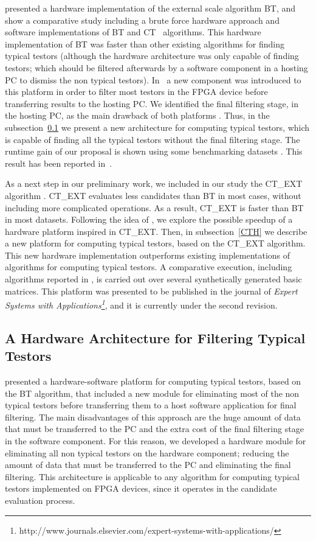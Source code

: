 \documentclass[authoryear,11pt]{elsarticle}
\begin{document}
	\cite{Rojas07} presented a hardware implementation of the external scale algorithm BT, and show a 
	comparative study including a brute force hardware approach and software implementations of BT and 
	CT~\citep{Bravo83} algorithms. 
	This hardware implementation of BT was faster than other existing algorithms for finding 
	typical	testors (although the hardware architecture was only capable of finding testors; which should 
	be filtered afterwards by a software component in a hosting PC to dismiss the non typical testors). 
	In~\citep{Rojas12} a new component was introduced to this platform in order to filter most testors in 
	the FPGA device before transferring results to the hosting PC. We identified the final filtering stage,
	in the hosting PC, as the main drawback of both platforms \citep{Rojas07,Rojas12}.
	Thus, in the subsection~\ref{OnlyTT} we present a new architecture 
	for computing typical testors, which is capable of finding all the typical testors without the
	final filtering stage. 
	The runtime gain of our proposal is shown using some benchmarking datasets \citep{Bache13}.
	This result has been reported in~\citep{Rodriguez14}. 
	
	As a next step in our preliminary work, we included in our study the CT\_EXT algorithm \citep{Sanchez07}.
	CT\_EXT evaluates less candidates than BT in most cases, without including more complicated operations.
	As a result, CT\_EXT is faster than BT in most datasets. Following the idea of \cite{Rojas07}, we explore
	the possible speedup of a hardware platform inspired in CT\_EXT.
	Then, in subsection~\ref{CTH} we	describe a new platform for computing typical testors, based on the 
	CT\_EXT algorithm. This new hardware implementation outperforms existing implementations of algorithms 
	for computing typical testors. A comparative execution, including algorithms reported in 
	\citep{Rodriguez14,Sanchez07}, is carried out over several synthetically generated basic matrices.
	This platform was presented to be published in the journal of \emph{Expert Systems with 
	Applications\footnote{http://www.journals.elsevier.com/expert-systems-with-applications/}}, and
	it is currently under the second revision.
	 
	
\subsection{A Hardware Architecture for Filtering Typical Testors}\label{OnlyTT}
	\cite{Rojas12} presented a hardware-software platform for computing typical testors, based on the BT algorithm, 
	that included a new module for eliminating most of the non typical testors before transferring them to a host 
	software application for final filtering. The main disadvantages of this approach are the huge amount of data that 
	must be transferred to the PC and the extra cost of the final filtering stage in the software component.  
	For this reason, we developed a hardware module for eliminating all non typical testors 
	on the hardware component; reducing the amount of data that must be transferred to the PC and eliminating the final
	filtering. This architecture is applicable to any algorithm for computing typical testors implemented on FPGA devices,
	since it operates in the candidate evaluation process.
	
\end{document}
